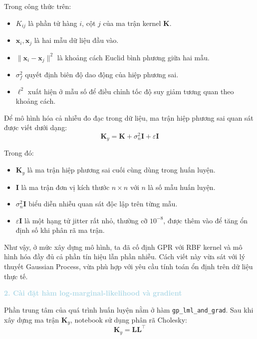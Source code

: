 Trong công thức trên:
\begin{itemize}
    \item $K_{ij}$ là phần tử hàng $i$, cột $j$ của ma trận kernel $\mathbf{K}$.
    \item $\mathbf{x}_i, \mathbf{x}_j$ là hai mẫu dữ liệu đầu vào.
    \item $\lVert \mathbf{x}_i - \mathbf{x}_j \rVert^2$ là khoảng cách Euclid bình phương giữa hai mẫu.
    \item $\sigma_f^2$ quyết định biên độ dao động của hiệp phương sai.
    \item $\ell^2$ xuất hiện ở mẫu số để điều chỉnh tốc độ suy giảm tương quan theo khoảng cách.
\end{itemize}

Để mô hình hóa cả nhiễu đo đạc trong dữ liệu, ma trận hiệp phương sai quan sát được viết dưới dạng:
\begin{equation}
    \mathbf{K}_y = \mathbf{K} + \sigma_n^2 \mathbf{I} + \varepsilon \mathbf{I}
\end{equation}

Trong đó:
\begin{itemize}
    \item $\mathbf{K}_y$ là ma trận hiệp phương sai cuối cùng dùng trong huấn luyện.
    \item $\mathbf{I}$ là ma trận đơn vị kích thước $n \times n$ với $n$ là số mẫu huấn luyện.
    \item $\sigma_n^2\mathbf{I}$ biểu diễn nhiễu quan sát độc lập trên từng mẫu.
    \item $\varepsilon\mathbf{I}$ là một hạng tử jitter rất nhỏ, thường cỡ $10^{-8}$, được thêm vào để tăng ổn định số khi phân rã ma trận.
\end{itemize}

Như vậy, ở mức xây dựng mô hình, ta đã cố định GPR với RBF kernel và mô hình hóa đầy đủ cả phần tín hiệu lẫn phần nhiễu. Cách viết này vừa sát với lý thuyết Gaussian Process, vừa phù hợp với yêu cầu tính toán ổn định trên dữ liệu thực tế.

\noindent\textcolor{lightblue}{\textbf{2. Cài đặt hàm log-marginal-likelihood và gradient}}

Phần trung tâm của quá trình huấn luyện nằm ở hàm \texttt{gp\_lml\_and\_grad}. Sau khi xây dựng ma trận $\mathbf{K}_y$, notebook sử dụng phân rã Cholesky:
\begin{equation}
    \mathbf{K}_y = \mathbf{L}\mathbf{L}^{\top}
\end{equation}

